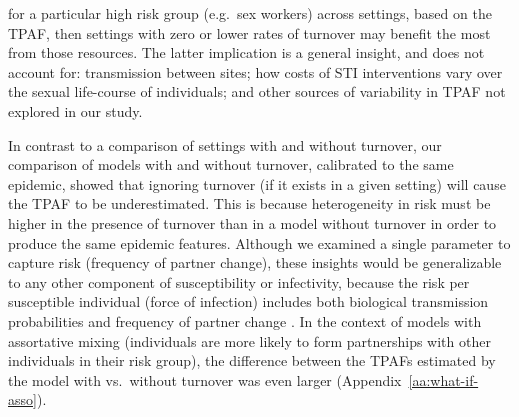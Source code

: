 for a particular high risk group (e.g.\ sex workers) across settings,
based on the TPAF, then settings with zero or lower rates of turnover
may benefit the most from those resources.
The latter implication is a general insight, and does not account for:
transmission between sites;
how costs of STI interventions vary over the sexual life-course of individuals;
and other sources of variability in TPAF not explored in our study.
\par
In contrast to a comparison of settings with and without turnover,
our comparison of models with and without turnover, calibrated to the same epidemic,
showed that ignoring turnover (if it exists in a given setting)
will cause the TPAF to be underestimated.
This is because heterogeneity in risk
must be higher in the presence of turnover than in a model without turnover
in order to produce the same epidemic features.
Although we examined a single parameter to capture risk (frequency of partner change),
these insights would be generalizable to
any other component of susceptibility or infectivity,
because the risk per susceptible individual (force of infection) includes both
biological transmission probabilities and frequency of partner change \citep{Anderson1991}.
In the context of models with assortative mixing
(individuals are more likely to form partnerships with
other individuals in their risk group),
the difference between the TPAFs estimated by the model
with vs.\ without turnover was even larger (Appendix~\ref{aa:what-if-asso}).

